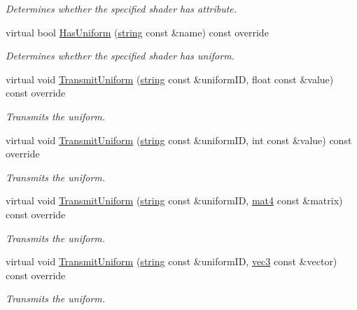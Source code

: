 \begin{DoxyCompactItemize}
\begin{DoxyCompactList}\small\item\em Determines whether the specified shader has attribute. \end{DoxyCompactList}\item 
virtual bool \hyperlink{class_shader_a7b41414851a8f8d8dd9206beb742e129}{Has\+Uniform} (\hyperlink{_types_8h_ad453f9f71ce1f9153fb748d6bb25e454}{string} const \&name) const  override
\begin{DoxyCompactList}\small\item\em Determines whether the specified shader has uniform. \end{DoxyCompactList}\item 
virtual void \hyperlink{class_shader_afe92af499f993c79af2454c272f85289}{Transmit\+Uniform} (\hyperlink{_types_8h_ad453f9f71ce1f9153fb748d6bb25e454}{string} const \&uniform\+ID, float const \&value) const  override
\begin{DoxyCompactList}\small\item\em Transmits the uniform. \end{DoxyCompactList}\item 
virtual void \hyperlink{class_shader_a9f3830e7499c7238072b43dc8c98b4de}{Transmit\+Uniform} (\hyperlink{_types_8h_ad453f9f71ce1f9153fb748d6bb25e454}{string} const \&uniform\+ID, int const \&value) const  override
\begin{DoxyCompactList}\small\item\em Transmits the uniform. \end{DoxyCompactList}\item 
virtual void \hyperlink{class_shader_aec2ffb53553f150448537a0cf047384d}{Transmit\+Uniform} (\hyperlink{_types_8h_ad453f9f71ce1f9153fb748d6bb25e454}{string} const \&uniform\+ID, \hyperlink{_types_8h_a2db59f395fe82a7394c6324956c265d8}{mat4} const \&matrix) const  override
\begin{DoxyCompactList}\small\item\em Transmits the uniform. \end{DoxyCompactList}\item 
virtual void \hyperlink{class_shader_af76b9d396dde760ab53f19574ccac555}{Transmit\+Uniform} (\hyperlink{_types_8h_ad453f9f71ce1f9153fb748d6bb25e454}{string} const \&uniform\+ID, \hyperlink{_types_8h_a3d0ce73e3199de81565fb01632415288}{vec3} const \&vector) const  override
\begin{DoxyCompactList}\small\item\em Transmits the uniform. \end{DoxyCompactList}\item 

\end{DoxyCompactItemize}
